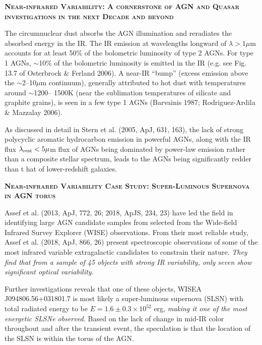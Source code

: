 \documentclass[12pt]{article}
\begin{document}
\smallskip
\smallskip
\noindent
{\bfseries \textsc{\textcolor{Cerulean}{
Near-infrared Variability: A cornerstone of AGN and Quasar investigations in the next Decade and beyond
}}}


\smallskip
\smallskip
\noindent

The circumnuclear dust absorbs the AGN illumination and reradiates the absorbed energy in the IR. The IR emission at wavelengths longward of $\lambda > 1 \mu$m accounts for at least 50\% of the bolometric luminosity of type 2 AGNs. For type 1 AGNs, $\sim$10\% of the bolometric luminosity is emitted in the IR (e.g. see Fig. 13.7 of Osterbrock \& Ferland 2006). A near-IR ``bump'' (excess emission above the $\sim$2–10$\mu$m continuum), generally attributed to hot dust with temperatures around $\sim$1200– 1500K (near the sublimation temperatures of silicate and graphite grains), is seen in a few type 1 AGNs (Barvainis 1987; Rodriguez-Ardila \& Mazzalay 2006).

\smallskip
\smallskip
\noindent
As discussed in detail in Stern et al. (2005, ApJ, 631, 163), the lack of strong polycyclic aromatic hydrocarbon emission in powerful AGNs, along with the IR flux $\lambda_{\rm rest} < 5 \mu$m flux of AGNs being dominated by power-law emission rather than a composite stellar spectrum, leads to the  AGNs being significantly redder than t
hat of lower-redshift galaxies. 

\smallskip
\smallskip
\noindent
\textbf{\textsc{Near-infrared Variability Case Study: Super-Luminous Supernova in AGN torus}} 

\smallskip
\smallskip
\noindent
Assef et al. (2013, ApJ, 772, 26; 2018, ApJS, 234, 23) have led the field in identifying large AGN candidate samples from selected from the Wide-field Infrared Survey Explorer (WISE) observations. 
From their most reliable study, Assef et al. (2018, ApJ, 866, 26) present spectroscopic observations of some of the most infrared variable extragalactic candidates to constrain their nature. {\it They find that from a sample of 45 objects with strong IR variability, only seven show significant optical variability.}  

\smallskip
\smallskip
\noindent
Further investigations reveals that one of these objects, WISEA J094806.56+031801.7  is most likely a super-luminous supernova (SLSN) with total radiated energy to be $E=1.6\pm0.3 \times 10^{52}$ erg, {\it making it one of the most energetic SLSNe observed.} Based on the lack of change in mid-IR color throughout and after the transient event, the speculation is that the location of the SLSN is within the torus of the AGN. 
\end{document}
